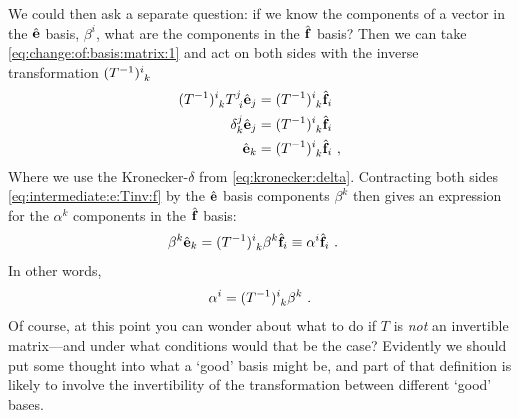 \documentclass[12pt, oneside]{report}    %
\begin{document}
We could then ask a separate question: if we know the components of a vector in the $\hat{\mathbf{e}}$ basis, $\beta^i$, what are the components in the $\hat{\mathbf{f}}$ basis? Then we can take \eqref{eq:change:of:basis:matrix:1} and act on both sides with the inverse transformation $(T\inv)\aij{i}{k}$
\begin{align}
    (T\inv)\aij{i}{k}T\aij{j}{i}\bas{e}_j &= (T\inv)\aij{i}{k}\bas{f}_i \\
    \delta^j_k \bas{e}_j &= (T\inv)\aij{i}{k}\bas{f}_i\\
    \bas{e}_k &=(T\inv)\aij{i}{k}\bas{f}_i \ ,
    \label{eq:intermediate:e:Tinv:f}
\end{align}
Where we use the Kronecker-$\delta$ from \eqref{eq:kronecker:delta}.
% 
Contracting both sides \eqref{eq:intermediate:e:Tinv:f} by the $\hat{\mathbf{e}}$ basis components $\beta^k$ then gives an expression for the $\alpha^k$ components in the $\hat{\mathbf{f}}$ basis:
\begin{align}
   \beta^k \bas{e}_k &=(T\inv)\aij{i}{k} \beta^k \bas{f}_i \equiv \alpha^i \bas{f}_i \ .
\end{align}
In other words,
\begin{align}
    \alpha^i = (T\inv)\aij{i}{k} \beta^k \ .
\end{align}
Of course, at this point you can wonder about what to do if $T$ is \emph{not} an invertible matrix---and under what conditions would that be the case? Evidently we should put some thought into what a `good' basis might be, and part of that definition is likely to involve the invertibility of the transformation between different `good' bases.
\end{document}
